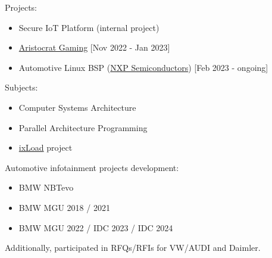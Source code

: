\documentclass[10pt,a4paper,ragged2e,withhyper]{altacv}
\begin{document}
\begin{paracol}{2}


Projects:
\begin{itemize}
\item Secure IoT Platform (internal project)
\item \href{https://www.aristocratgaming.com/us/}{Aristocrat Gaming} [Nov 2022 - Jan 2023]
\item Automotive Linux BSP (\href{https://www.nxp.com/products/processors-and-microcontrollers/s32-automotive-platform/s32g-vehicle-network-processors:S32G-PROCESSORS}{NXP Semiconductors}) [Feb 2023 - ongoing]
\end{itemize}

\divider

Subjects:
\begin{itemize}
\item Computer Systems Architecture
\item Parallel Architecture Programming
\end{itemize}

\divider

\begin{itemize}
    \item \href{https://www.keysight.com/us/en/products/network-test/protocol-load-test/ixload.html}{ixLoad} project
\end{itemize}

\divider

Automotive infotainment projects development:
\begin{itemize}
    \item BMW NBTevo
    \item BMW MGU 2018 / 2021
    \item BMW MGU 2022 / IDC 2023 / IDC 2024    
\end{itemize}
Additionally, participated in RFQs/RFIs for VW/AUDI and Daimler.
\\
\divider


\end{paracol}
\end{document}
